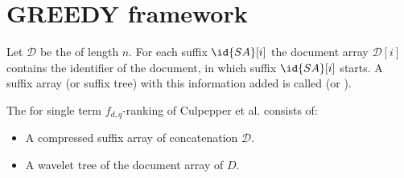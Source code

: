\section{GREEDY framework}

\begin{Definition}
  Let $\mathcal{D}$ be the  of length $n$. For each suffix $\id{SA}[i]$ the document array $\mathcal{D}[i]$ contains the identifier of the document, in which suffix $\id{SA}[i]$ starts. A suffix array (or suffix tree) with this information added is called  (or ).
\end{Definition}

\begin{Definition}
  The  for single term $f_{d,q}$-ranking of Culpepper et al. \cite{Culpepper2010} consists of:
  \begin{itemize}
    \item A compressed suffix array  of concatenation $\mathcal{D}$.
    \item A wavelet tree of the document array of $D$.
  \end{itemize}
\end{Definition}
